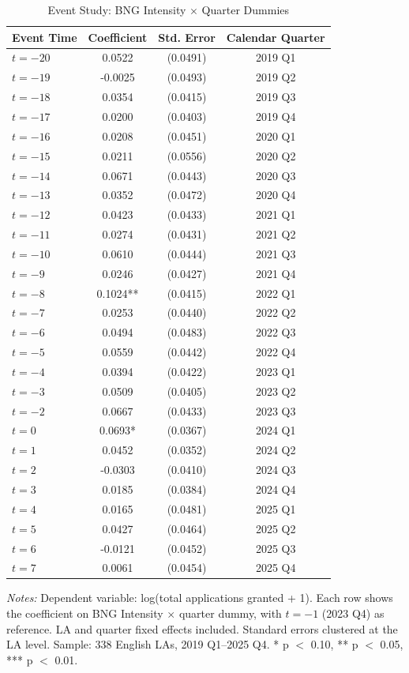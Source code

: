 \begin{table}[htbp]
\centering
\caption{Event Study: BNG Intensity $\times$ Quarter Dummies}
\label{tab:event_study}
\begin{tabular}{lccc}
\hline\hline
Event Time & Coefficient & Std. Error & Calendar Quarter \\
\hline
$t = -20$ & 0.0522 & (0.0491) & 2019 Q1 \\
$t = -19$ & -0.0025 & (0.0493) & 2019 Q2 \\
$t = -18$ & 0.0354 & (0.0415) & 2019 Q3 \\
$t = -17$ & 0.0200 & (0.0403) & 2019 Q4 \\
$t = -16$ & 0.0208 & (0.0451) & 2020 Q1 \\
$t = -15$ & 0.0211 & (0.0556) & 2020 Q2 \\
$t = -14$ & 0.0671 & (0.0443) & 2020 Q3 \\
$t = -13$ & 0.0352 & (0.0472) & 2020 Q4 \\
$t = -12$ & 0.0423 & (0.0433) & 2021 Q1 \\
$t = -11$ & 0.0274 & (0.0431) & 2021 Q2 \\
$t = -10$ & 0.0610 & (0.0444) & 2021 Q3 \\
$t = -9$ & 0.0246 & (0.0427) & 2021 Q4 \\
$t = -8$ & 0.1024** & (0.0415) & 2022 Q1 \\
$t = -7$ & 0.0253 & (0.0440) & 2022 Q2 \\
$t = -6$ & 0.0494 & (0.0483) & 2022 Q3 \\
$t = -5$ & 0.0559 & (0.0442) & 2022 Q4 \\
$t = -4$ & 0.0394 & (0.0422) & 2023 Q1 \\
$t = -3$ & 0.0509 & (0.0405) & 2023 Q2 \\
$t = -2$ & 0.0667 & (0.0433) & 2023 Q3 \\
$t = 0$ & 0.0693* & (0.0367) & 2024 Q1 \\
$t = 1$ & 0.0452 & (0.0352) & 2024 Q2 \\
$t = 2$ & -0.0303 & (0.0410) & 2024 Q3 \\
$t = 3$ & 0.0185 & (0.0384) & 2024 Q4 \\
$t = 4$ & 0.0165 & (0.0481) & 2025 Q1 \\
$t = 5$ & 0.0427 & (0.0464) & 2025 Q2 \\
$t = 6$ & -0.0121 & (0.0452) & 2025 Q3 \\
$t = 7$ & 0.0061 & (0.0454) & 2025 Q4 \\
\hline\hline
\end{tabular}
\begin{tablenotes}[flushleft]\small
\item \textit{Notes:} Dependent variable: log(total applications granted + 1). Each row shows the coefficient on BNG Intensity $\times$ quarter dummy, with $t = -1$ (2023 Q4) as reference. LA and quarter fixed effects included. Standard errors clustered at the LA level. Sample: 338 English LAs, 2019 Q1--2025 Q4. * p $<$ 0.10, ** p $<$ 0.05, *** p $<$ 0.01.
\end{tablenotes}
\end{table}

